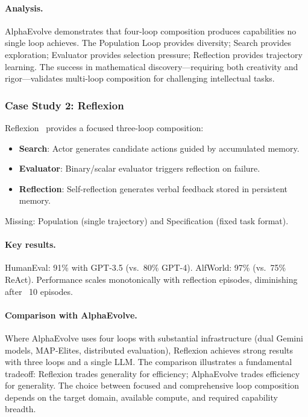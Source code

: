 \paragraph{Analysis.}
AlphaEvolve demonstrates that four-loop composition produces capabilities no single loop achieves. The Population Loop provides diversity; Search provides exploration; Evaluator provides selection pressure; Reflection provides trajectory learning. The success in mathematical discovery---requiring both creativity and rigor---validates multi-loop composition for challenging intellectual tasks.

\subsubsection{Case Study 2: Reflexion}

Reflexion~\citep{shinn2023reflexion} provides a focused three-loop composition:

\begin{itemize}
    \item \textbf{Search}: Actor generates candidate actions guided by accumulated memory.
    \item \textbf{Evaluator}: Binary/scalar evaluator triggers reflection on failure.
    \item \textbf{Reflection}: Self-reflection generates verbal feedback stored in persistent memory.
\end{itemize}

Missing: Population (single trajectory) and Specification (fixed task format).

\paragraph{Key results.}
HumanEval: 91\% with GPT-3.5 (vs.\ 80\% GPT-4). AlfWorld: 97\% (vs.\ 75\% ReAct). Performance scales monotonically with reflection episodes, diminishing after ~10 episodes.

\paragraph{Comparison with AlphaEvolve.}
Where AlphaEvolve uses four loops with substantial infrastructure (dual Gemini models, MAP-Elites, distributed evaluation), Reflexion achieves strong results with three loops and a single LLM. The comparison illustrates a fundamental tradeoff: Reflexion trades generality for efficiency; AlphaEvolve trades efficiency for generality. The choice between focused and comprehensive loop composition depends on the target domain, available compute, and required capability breadth.


